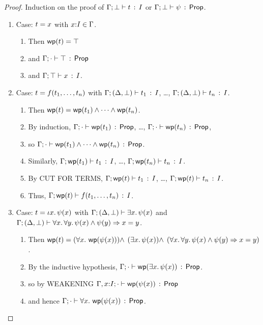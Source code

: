 \documentclass[11pt]{article}
\begin{document}
\begin{proof}
  \raggedright Induction on the proof of
  $\Gamma;\bot \vdash t\, :\, I$ or $\Gamma;\bot \vdash \psi\, :\, \mathsf{Prop}$.
  \begin{enumerate}
  \item Case: $t = x$ with $x{:}I\in\Gamma$.  
    \begin{enumerate}
      \item
        Then $\mathop{\mathsf{wp}}(t) = \top$ 
      \item
        and $\Gamma;\cdot \vdash \top\, :\, \mathsf{Prop}$ 
      \item
        and $\Gamma;\top \vdash x\, :\, I$.
      \end{enumerate}
  \item Case: $t = f({t}_1,\ldots,{t}_{n})$ with
    $\Gamma;(\Delta,\bot) \vdash t_1\, :\, I$, \ldots,
    $\Gamma;(\Delta,\bot) \vdash t_n\, :\, I$. 
    \begin{enumerate}
    \item
      Then $\mathop{\mathsf{wp}}(t) =
      \mathop{\mathsf{wp}}(t_1) \wedge \cdots \wedge \mathop{\mathsf{wp}}(t_n)$.  
    \item By induction,
      $\Gamma;\cdot \vdash \mathop{\mathsf{wp}}(t_1)\, :\, \mathsf{Prop}$, \ldots,
    $\Gamma;\cdot \vdash \mathop{\mathsf{wp}}(t_n)\, :\, \mathsf{Prop}$, 
    \item so
    $\Gamma;\cdot \vdash \mathop{\mathsf{wp}}(t_1) \wedge \cdots \wedge \mathop{\mathsf{wp}}(t_n)\, :\, \mathsf{Prop}$.
    \item 
    Similarly, $\Gamma;\mathop{\mathsf{wp}}(t_1) \vdash t_1\, :\, I$, \ldots,
    $\Gamma;\mathop{\mathsf{wp}}(t_n) \vdash t_n\, :\, I$.  
    \item
      By CUT FOR TERMS,
      $\Gamma;\mathop{\mathsf{wp}}(t) \vdash t_1\, :\, I$, \ldots,
      $\Gamma;\mathop{\mathsf{wp}}(t) \vdash t_n\, :\, I$.  
    \item Thus,
      $\Gamma;\mathop{\mathsf{wp}}(t) \vdash f({t}_1,\ldots,{t}_{n})\, :\, I$.  
    \end{enumerate}
  \item Case: $t = \iota x.\, \psi(x)$ with
  $\Gamma;(\Delta,\bot) \vdash \exists x.\, \psi(x)$ and 
  $\Gamma;(\Delta,\bot) \vdash \forall x.\, \forall y.\, \psi(x) \wedge \psi(y) \Rightarrow x=y$.

    \begin{enumerate}
      \item Then
        $\mathop{\mathsf{wp}}(t) = 
        (\forall x.\, \mathop{\mathsf{wp}}(\psi(x))) \wedge$
        $(\exists x.\, \psi(x)) \wedge$
        $(\forall x.\, \forall y.\, \psi(x) \wedge \psi(y) \Rightarrow x=y)$.
      \item 
        By the inductive hypothesis, $\Gamma;\cdot \vdash \mathop{\mathsf{wp}}(\exists x.\, \psi(x))\, :\, \mathsf{Prop}$.
      \item 
        so by WEAKENING $\Gamma,x{:}I;\cdot \vdash \mathop{\mathsf{wp}}(\psi(x))\, :\, \mathsf{Prop}$ 
      \item 
        and hence $\Gamma;\cdot \vdash \forall x.\, \mathop{\mathsf{wp}}(\psi(x))\, :\, \mathsf{Prop}$.
      \end{enumerate}

  \end{enumerate}
\end{proof}
\end{document}

